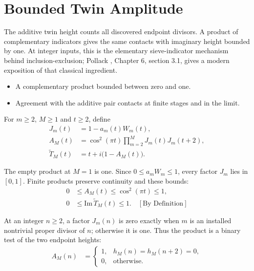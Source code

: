 \section{Bounded Twin Amplitude}
The additive twin height counts all discovered endpoint divisors. A product
of complementary indicators gives the same contacts with imaginary height
bounded by one. At integer inputs, this is the elementary sieve-indicator
mechanism behind inclusion-exclusion; Pollack \cite{pollack2009}, Chapter 6,
section 3.1, gives a modern exposition of that classical ingredient.

\begin{itemize}
\item A complementary product bounded between zero and one.
\item Agreement with the additive pair contacts at finite stages and in the limit.
\end{itemize}

For $m\ge2$, $M\ge1$ and $t\ge2$, define
\begin{equation*}
\begin{aligned}
J_m(t)&=1-a_m(t)W_m(t),\\
A_M(t)&=\cos^2(\pi t)\prod_{m=2}^{M}J_m(t)J_m(t+2),\\
\widetilde T_M(t)&=t+i\bigl(1-A_M(t)\bigr).
\end{aligned}
\end{equation*}

The empty product at $M=1$ is one. Since $0\le a_mW_m\le1$, every factor
$J_m$ lies in $[0,1]$. Finite products preserve continuity and these bounds:
\begin{equation*}
\begin{aligned}
0&\le A_M(t)\le\cos^2(\pi t)\le1,\\
0&\le\text{Im}\,\widetilde T_M(t)\le1.
\quad[\text{By Definition}]
\end{aligned}
\end{equation*}

At an integer $n\ge2$, a factor $J_m(n)$ is zero exactly when $m$ is an
installed nontrivial proper divisor of $n$; otherwise it is one. Thus the
product is a binary test of the two endpoint heights:
\begin{equation*}
\begin{aligned}
A_M(n)&=\begin{cases}
1,&h_M(n)=h_M(n+2)=0,\\
0,&\text{otherwise}.
\end{cases}
\end{aligned}
\end{equation*}

